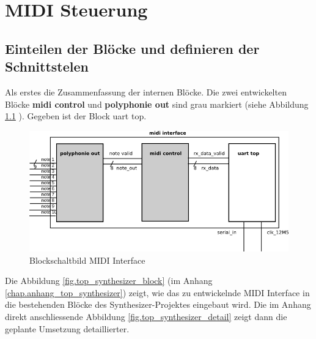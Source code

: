 
\chapter{MIDI Steuerung}\label{chap.midi}

\section{Einteilen der Blöcke und definieren der Schnittstelen}

Als erstes die Zusammenfassung der internen Blöcke. Die zwei entwickelten Blöcke \textbf{midi control} und \textbf{polyphonie out} sind grau markiert (siehe Abbildung \ref{fig.midi_interface_block} ). Gegeben ist der Block uart top. \\

\begin{figure}[H]
	\centering
	\includegraphics[width=1\textwidth]{images/midi_interface/midi_interface_block.png}
	\caption{Blockschaltbild MIDI Interface}
	\label{fig.midi_interface_block}
\end{figure}

Die Abbildung \ref{fig.top_synthesizer_block} (im Anhang \ref{chap.anhang_top_synthesizer}) zeigt, wie das zu entwickelnde MIDI Interface in die bestehenden Blöcke des Synthesizer-Projektes eingebaut wird. Die im Anhang direkt anschliessende Abbildung \ref{fig.top_synthesizer_detail} zeigt dann die geplante Umsetzung detaillierter.\\





